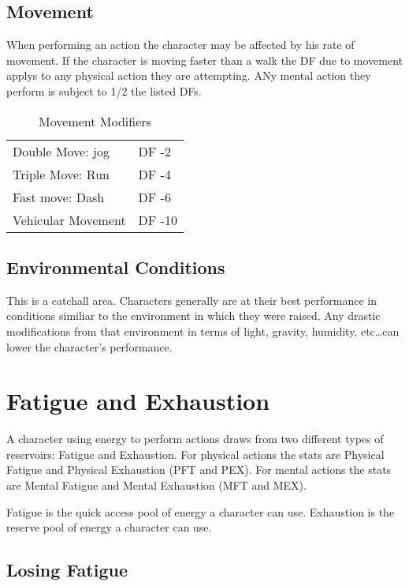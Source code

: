 


\subsection{Movement} 

When performing an action the character may be affected by 
his rate of movement. If the character is moving faster than a 
walk the DF due to movement applys to any physical action they are 
attempting. ANy mental action they perform is subject to 1/2 
the listed DFs.

\begin{table}[h]
	\begin{tabular}{ll}
	Double Move: jog							  & DF -2 \\
	Triple Move: Run							  & DF -4 \\
	Fast move: Dash							 & DF -6\\
	Vehicular Movement							& DF -10 \\ 
    \end{tabular}
    \caption{Movement Modifiers}
\end{table}

\subsection{Environmental Conditions}

This is a catchall area. Characters generally are at their best 
performance in conditions similiar to the environment in which they 
were raised. Any drastic modifications from that environment in 
terms of light, gravity, humidity, etc\dots can lower the character's 
performance.



\section{Fatigue and Exhaustion}

A character using energy to perform actions draws from two different 
types of reservoirs: Fatigue and Exhaustion. For physical actions the 
stats are Physical Fatigue and Physical Exhaustion (PFT and PEX). For mental
actions the stats are Mental Fatigue and Mental Exhaustion (MFT and MEX).

Fatigue is the quick access pool of energy a character can use.
Exhaustion is the reserve pool of energy a character can use. 

\subsection{Losing Fatigue}

